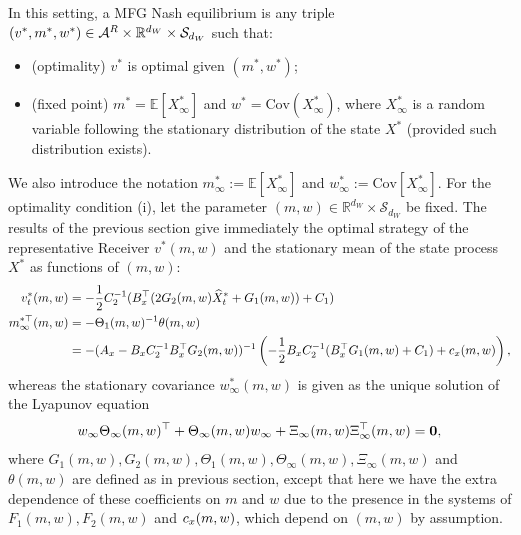 \documentclass[a4paper,10pt]{article}
\newcommand{\EE}{\mathbb{E}}
\newcommand{\RR}{\mathbb{R}}
\theoremstyle{definition}
\theoremstyle{plain}
\numberwithin{equation}{section}
\begin{document}
In this setting, a MFG Nash equilibrium is any triple $(v^*,m^*, w^*) \in \mathcal A^{\rm R} \times \mathbb R^{d_W} \times \mathcal S_{d_W} $ such that:
\begin{itemize} 
\item[(i)] (optimality) $v^*$ is optimal given $(m^*,w^*)$;
\item[(ii)] (fixed point) $m^* = \mathbb E[X_\infty ^*]$ and $w^* = \text{Cov}(X_\infty ^*)$, where $X_\infty ^*$ is a random variable following the stationary distribution of the state $X^*$ (provided such distribution exists). 
\end{itemize} 
We also introduce the notation $m^*_\infty := \EE[X^*_\infty]$ and $w^*_\infty := \text{Cov}[X_\infty ^*]$.
For the optimality condition (i), let the parameter $(m,w) \in \RR^{d_W} \times \mathcal S_{d_W} $ be fixed. The results of the previous section give immediately the optimal strategy of the representative Receiver $v^* (m,w)$ and the stationary mean of the state process $X^*$ as functions of $(m,w)$:
\begin{align}
	v_t ^* (m,w) & =  - \frac{1}{2}C_2 ^{-1}(B_{\rm x} ^\top(2 G_2 (m,w) \widehat X_t ^* + G_1 (m,w)) + C_1) \\ 
	m_\infty ^{*\top}(m,w)  & = -\Theta_1(m,w) ^{-1} \theta(m,w) \nonumber\\
	& = -(A_{\rm x} - B_{\rm x} C_2^{-1} B_{\rm x} ^\top G_2(m,w)) ^{-1}\left(-\frac{1}{2} B_{\rm x} C_2^{-1} (B_{\rm x} ^\top G_1(m,w) +C_1) +c_{\rm x}(m,w)\right) ,
\end{align}
whereas the stationary covariance $w_\infty ^*(m,w)$ is given as the unique solution of the Lyapunov equation
\begin{align}
	w_\infty \Theta_\infty (m,w) ^\top + \Theta_\infty (m,w) w_\infty +\Xi_\infty (m,w)  \Xi_\infty^\top (m,w) =\bold{0},
\end{align}
where $G_1(m,w),G_2(m,w), \Theta_1(m,w), \Theta_\infty (m,w), \Xi_\infty (m,w)$ and $\theta(m,w)$ are defined as in previous section, except that here we have the extra dependence of these coefficients on $m$ and $w$ due to the presence in the systems of $F_1(m,w), F_2(m,w)$ and $c_{\rm x}(m,w)$, which depend on $(m,w)$ by assumption.
\end{document}
